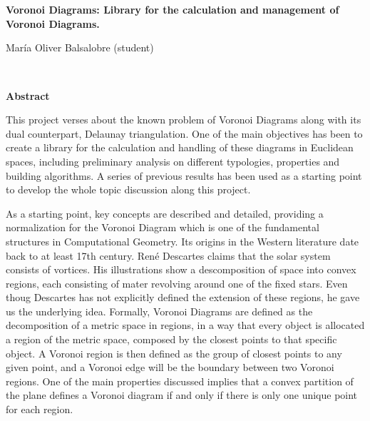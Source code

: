 \cleardoublepage

\chapter*{}

\thispagestyle{empty}


\begin{center}
	{\large\bfseries Voronoi Diagrams: Library for the calculation and management of Voronoi Diagrams.}\\
\end{center}
\begin{center}
	María Oliver Balsalobre (student)\\
\end{center}

\vspace{0.7cm}
\\

\vspace{0.7cm}
\centerline{\textbf{Abstract}}

\bigskip 

This project verses about the known problem of Voronoi Diagrams along with its dual counterpart, Delaunay triangulation. One of the main objectives has been to create a library for the calculation and handling of these diagrams in Euclidean spaces, including preliminary analysis on different typologies, properties and building algorithms. A series of previous results has been used as a starting point to develop the whole topic discussion along this project.

As a starting point, key concepts are described and detailed, providing a normalization for the Voronoi Diagram which is one of the fundamental structures in Computational Geometry. Its origins in the Western literature date back to at least 17th century. René Descartes claims that the solar system consists of vortices.  His illustrations show a descomposition of space into convex regions, each consisting of mater revolving around one of the fixed stars. Even thoug Descartes has not explicitly defined the extension of these regions, he gave us the underlying idea. Formally, Voronoi Diagrams are defined as the decomposition of a metric space in regions, in a way that every object is allocated a region of the metric space, composed by the closest points to that specific object. A Voronoi region is then defined as the group of closest points to any given point, and a Voronoi edge will be the boundary between two Voronoi regions. One of the main properties discussed implies that a convex partition of the plane defines a Voronoi diagram if and only if there is only one unique point for each region. 

